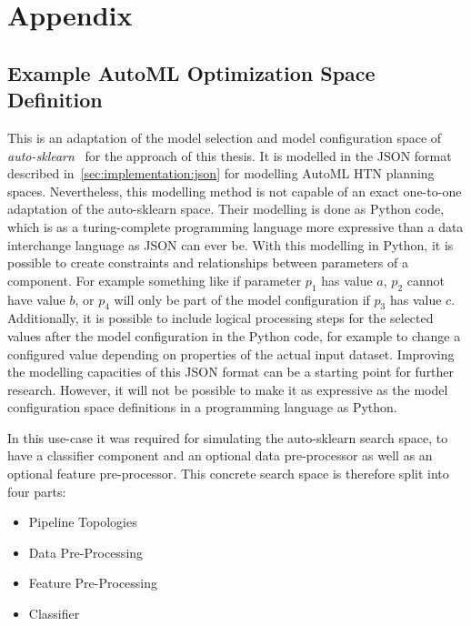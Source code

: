 %
\chapter{Appendix}
\label{sec:appendix}

\section{Example AutoML Optimization Space Definition}
\label{sec:appendix:htn-space}
This is an adaptation of the model selection and model configuration space of \textit{auto-sklearn}~\cite{Feurer-AutoSklearn} for the approach of this thesis.
It is modelled in the JSON format described in~\ref{sec:implementation:json} for modelling AutoML HTN planning spaces.\newline
Nevertheless, this modelling method is not capable of an exact one-to-one adaptation of the auto-sklearn space.
Their modelling is done as Python code, which is as a turing-complete programming language more expressive than a data interchange language as JSON can ever be.
With this modelling in Python, it is possible to create constraints and relationships between parameters of a component.
For example something like if parameter $p_1$ has value $a$, $p_2$ cannot have value $b$, or $p_4$ will only be part of the model configuration if $p_3$ has value $c$.\newline
Additionally, it is possible to include logical processing steps for the selected values after the model configuration in the Python code, for example to change a configured value depending on properties of the actual input dataset.\newline
Improving the modelling capacities of this JSON format can be a starting point for further research.
However, it will not be possible to make it as expressive as the model configuration space definitions in a programming language as Python.

In this use-case it was required for simulating the auto-sklearn search space, to have a classifier component and an optional data pre-processor as well as an optional feature pre-processor.
This concrete search space is therefore split into four parts:
\begin{itemize}
    \item Pipeline Topologies
    \item Data Pre-Processing
    \item Feature Pre-Processing
    \item Classifier
\end{itemize}

